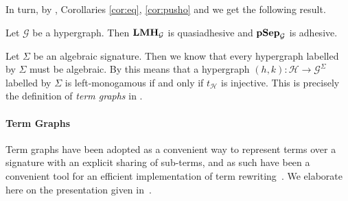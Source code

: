 \documentclass[3p]{elsarticle}
\newcommand{\catname}[1]{\textbf{\textup{#1}}}
\newcommand{\lmo}{\catname{LMH}}
\newcommand{\hyp}{\catname{Hyp}}
\newcommand{\pshyp}{\catname{pSep}}
\newcommand{\tg}[0]{\catname{TG}_{\Sigma}}
\theoremstyle{remark}
\theoremstyle{definition}
\begin{document}
In turn, by , Corollaries \ref{cor:eq}, \ref{cor:pusho} and  we get the following result.

\begin{thm}\label{thm:tg} Let $\mathcal{G}$ be a hypergraph. Then %
		$\lmo_{\mathcal{G}}$ is quasiadhesive and $\pshyp_{\mathcal{G}}$ is adhesive.
\end{thm}

\begin{rem}\label{rem:tg}
	Let $\Sigma$ be an algebraic signature. Then we know that every hypergraph labelled by $\Sigma$ must be algebraic. By  this means that a hypergraph $(h,k)\colon \mathcal{H}\to \mathcal{G}^\Sigma$ labelled by $\Sigma$ is left-monogamous if and only if $t_{\mathcal{H}}$ is injective. This is precisely the definition of \emph{term graphs} in \cite{Plu:TGR-ENTCS,CorradiniG05,CastelnovoGM24}. 
\end{rem}


\iffalse 
\color{black}
\paragraph{Term Graphs}\label{par:tg}
Term graphs have been adopted as a convenient way to represent terms over a signature with an explicit sharing of sub-terms,
and as such have been a convenient tool for an efficient implementation of term rewriting~\cite{Plu:TGR-ENTCS}.
We elaborate here on the presentation given in~\cite{CastelnovoGM24}.



\end{document}
